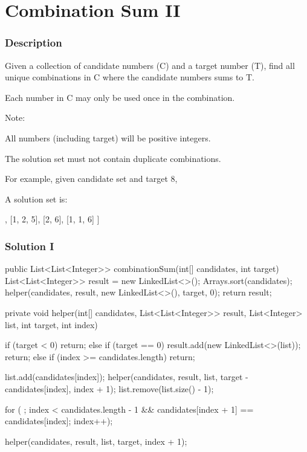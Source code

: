 \newpage

\section{Combination Sum II} %

\subsubsection{Description}
Given a collection of candidate numbers (C) and a target number (T), find all unique combinations in C where the candidate numbers sums to T.

Each number in C may only be used once in the combination.

Note:

All numbers (including target) will be positive integers.

The solution set must not contain duplicate combinations.

For example, given candidate set \code{[10, 1, 2, 7, 6, 1, 5]} and target 8,

A solution set is:
\begin{Code}
[
  [1, 7],
  [1, 2, 5],
  [2, 6],
  [1, 1, 6]
]
\end{Code}

\subsubsection{Solution I}

\begin{Code}
public List<List<Integer>> combinationSum(int[] candidates, int target) {
    List<List<Integer>> result = new LinkedList<>();
    Arrays.sort(candidates);
    helper(candidates, result, new LinkedList<>(), target, 0);
    return result;
}

private void helper(int[] candidates, List<List<Integer>> result, List<Integer> list, int target, int index) {
    if (target < 0) {
        return;
    } else if (target == 0) {
        result.add(new LinkedList<>(list));
        return;
    } else if (index >= candidates.length) {
        return;
    }

    list.add(candidates[index]);
    helper(candidates, result, list, target - candidates[index], index + 1);
    list.remove(list.size() - 1);

    for ( ; index < candidates.length - 1 && candidates[index + 1] == candidates[index]; index++);

    helper(candidates, result, list, target, index + 1);
}
\end{Code}

